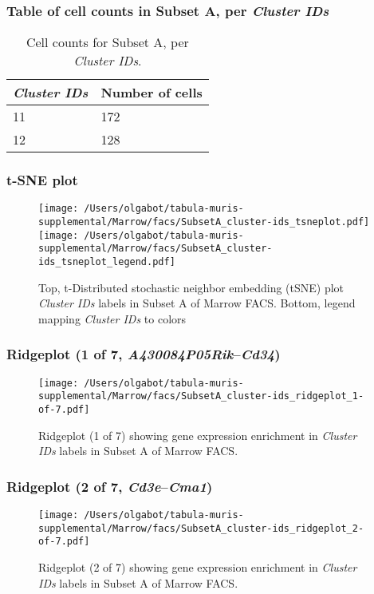 \subsubsection{Table of cell counts in Subset A, per \emph{Cluster IDs}}\begin{table}[h]
\centering
\label{my-label}
\begin{tabular}{@{}ll@{}}
\toprule

\emph{Cluster IDs}& Number of cells \\ \midrule
11 & 172 \\

12 & 128 \\
\bottomrule
\end{tabular}
\caption{Cell counts for Subset A, per \emph{Cluster IDs}.}
\end{table}

\clearpage
\subsubsection{t-SNE plot}
\begin{figure}[h]
\centering
\texttt{[image: /Users/olgabot/tabula-muris-supplemental/Marrow/facs/SubsetA\_cluster-ids\_tsneplot.pdf]}
\texttt{[image: /Users/olgabot/tabula-muris-supplemental/Marrow/facs/SubsetA\_cluster-ids\_tsneplot\_legend.pdf]}
\caption{Top, t-Distributed stochastic neighbor embedding (tSNE) plot  \emph{Cluster IDs} labels in Subset A of Marrow FACS. Bottom, legend mapping \emph{Cluster IDs} to colors}
\end{figure}


\clearpage

\subsubsection{Ridgeplot (1 of 7, \emph{A430084P05Rik}--\emph{Cd34})}
\begin{figure}[h]
\centering
\texttt{[image: /Users/olgabot/tabula-muris-supplemental/Marrow/facs/SubsetA\_cluster-ids\_ridgeplot\_1-of-7.pdf]}

\caption{ Ridgeplot (1 of 7)  showing gene expression enrichment in \emph{Cluster IDs} labels in Subset A of Marrow FACS. }
\end{figure}


\clearpage

\subsubsection{Ridgeplot (2 of 7, \emph{Cd3e}--\emph{Cma1})}
\begin{figure}[h]
\centering
\texttt{[image: /Users/olgabot/tabula-muris-supplemental/Marrow/facs/SubsetA\_cluster-ids\_ridgeplot\_2-of-7.pdf]}

\caption{ Ridgeplot (2 of 7)  showing gene expression enrichment in \emph{Cluster IDs} labels in Subset A of Marrow FACS. }
\end{figure}


